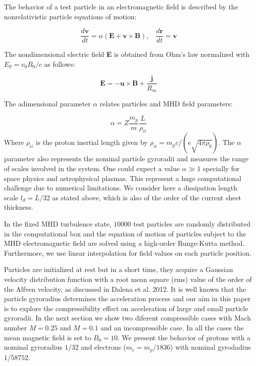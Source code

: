 \documentclass[%
aip,pop,amsmath,amssymb,
 reprint,%
]{revtex4-1}
\begin{document}
The behavior of a test particle in an electromagnetic field 
is described by 
the nonrelativistic particle equations of motion:

\begin{equation}
  \frac{d\textbf{v}}{dt} = \alpha(\textbf{E} + \textbf{v} \times \textbf{B}), \ \ \ \  \frac{d\textbf{r}}{dt} = \textbf{v}
\end{equation}
 
The nondimensional electric field \textbf{E} is obtained from Ohm's law 
normalized with $E_0= v_0 B_0/c$ as follows:

\begin{equation}
 \textbf{E} =  -\textbf{u}  \times \textbf{B} + \frac{\textbf{j}}{R_m} 
\end{equation}

The adimensional parameter $\alpha$ relates particles and MHD field parameters:

\begin{equation}
\alpha=Z\frac{m_p}{m}\frac{L}{\rho_{ii}}
\end{equation}
Where $\rho_{ii}$ is the proton inertial length given 
by $\rho_{ii}=m_pc/(e\sqrt{4\pi\rho_0})$. The $\alpha$ parameter also 
represents the nominal 
particle gyroradii and measures the range of scales involved in the system.
One could expect a value
$\alpha \gg 1$ specially for space physics and astrophysical plasmas.
This represent a huge computational challenge due to 
numerical limitations. 
We consider here a dissipation length scale
$l_d=L/32$ as stated above, which is also of the order of
the current sheet thickness.

In the fixed MHD turbulence state, $10000$ test particles are 
randomly distributed 
in the computational box and the equation of motion of particles 
subject to the MHD
electromagnetic field are solved using a high-order Runge-Kutta method. 
Furthermore, 
we use linear interpolation for field values on each particle position.


Particles are initialized at rest but in a short time, they
acquire a Gaussian velocity distribution function with a 
root mean square (rms) value of the order of the Alfven velocity, 
as discussed in Dalena et al. 2012.
It is
well known that the particle gyroradius determines the acceleration 
process and our aim in 
this paper is to explore the compressibility effect on 
acceleration of large and small particle 
gyroradii. In the next section we show two diferent compressible cases 
with Mach number $M=0.25$ and $M=0.1$ 
and an incompressible case. In all the cases the mean magnetic field
is set to $B_0=10$. We present the behavior of protons with a 
nominal gyroradius $1/32$ and electrons  ($m_e=m_p/1836$)
with nominal gyrodadius $1/58752$.
\end{document}
